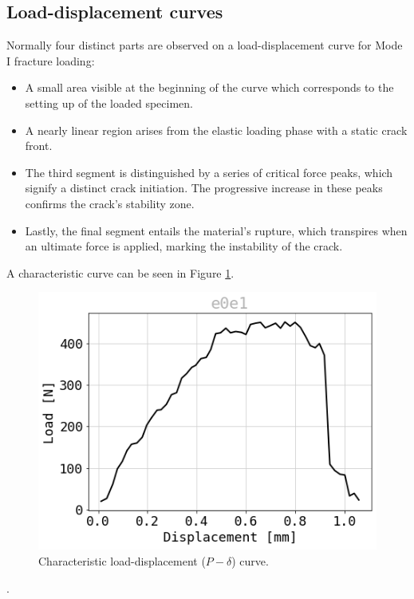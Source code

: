 \documentclass[3p,times,procedia]{elsarticle}
\begin{document}
\subsection{Load-displacement curves}

Normally four distinct parts are observed on a load-displacement curve for Mode I fracture loading:

\begin{itemize}
	\item A small area visible at the beginning of the curve which corresponds to the setting up of the loaded specimen. 
	\item A nearly linear region arises from the elastic loading phase with a static crack front.
	\item The third segment is distinguished by a series of critical force peaks, which signify a distinct crack initiation. The progressive increase in these peaks confirms the crack's stability zone.
	\item Lastly, the final segment entails the material's rupture, which transpires when an ultimate force is applied, marking the instability of the crack.
\end{itemize}

A characteristic curve can be seen in Figure \ref{fig:e0e1_Pdelta}.

\begin{figure}[th]
	\centering
	\includegraphics[scale=0.5]{Figures/P_e0e1}
	\caption[MMCG specimen]{Characteristic load-displacement ($P-\delta$) curve.}
	\label{fig:e0e1_Pdelta}
\end{figure}.
\end{document}
